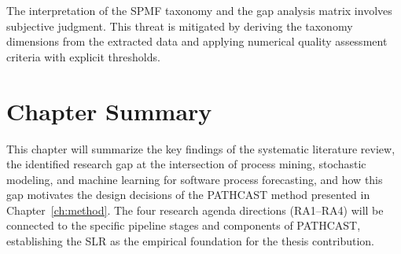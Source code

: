 The interpretation of the SPMF taxonomy and the gap analysis matrix involves subjective judgment. This threat is mitigated by deriving the taxonomy dimensions from the extracted data and applying numerical quality assessment criteria with explicit thresholds.


\section{Chapter Summary}
\label{sec:slr-summary}


This chapter will summarize the key findings of the systematic literature review, the identified research gap at the intersection of process mining, stochastic modeling, and machine learning for software process forecasting, and how this gap motivates the design decisions of the PATHCAST method presented in Chapter~\ref{ch:method}. The four research agenda directions (RA1--RA4) will be connected to the specific pipeline stages and components of PATHCAST, establishing the SLR as the empirical foundation for the thesis contribution.
